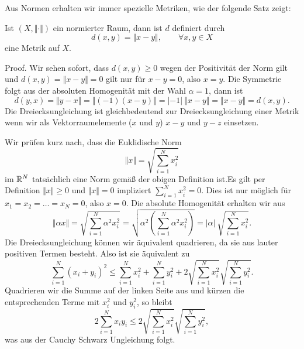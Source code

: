 Aus Normen erhalten wir immer spezielle Metriken, wie der folgende Satz zeigt:
\label{metrik/normen:theorem-2}
\begin{theorem}{}{}



Ist \((X,\Vert \cdot \Vert)\) ein normierter Raum, dann ist \(d\) definiert durch
\begin{equation*}
 d(x,y) = \Vert x - y \Vert ,\qquad \forall x,y \in X
\end{equation*}
eine Metrik auf \(X\).
\end{theorem}

\begin{emphBox}{}{}
Proof. Wir sehen sofort, dass \(d(x,y) \geq 0\) wegen der Positivität der Norm gilt und \(d(x,y) = \Vert x - y\Vert = 0\) gilt nur für \(x-y = 0\), also \(x=y\). Die Symmetrie folgt aus der absoluten Homogenität mit der Wahl \(\alpha = 1\), dann ist
\begin{equation*}
 d(y,x) = \Vert y- x \Vert = \Vert (-1)(x-y) \Vert = |-1|~\Vert x -y \Vert = \Vert x-y \Vert = d(x,y).
\end{equation*}
Die Dreiecksungleichung ist  gleichbedeutend zur Dreiecksungleichung einer Metrik wenn wir als Vektorraumelemente (\(x\) und \(y\)) \(x-y\) und \(y-z\) einsetzen.
\end{emphBox}
\label{metrik/normen:example-3}
\begin{example}{}{}



Wir prüfen kurz nach, dass die Euklidische Norm
\begin{equation*}
 \Vert x \Vert = \sqrt{\sum_{i=1}^N x_i^2}
\end{equation*}
im \(\mathbb{R}^N\) tatsächlich eine Norm gemäß der obigen Definition ist.Es gilt per Definition \(\Vert x \Vert \geq 0\) und \(\Vert x \Vert = 0\) impliziert \(\sum_{i=1}^N x_i^2=0\). Dies ist nur möglich für \(x_1=x_2=\ldots=x_N=0\), also \(x=0\). Die absolute Homogenität erhalten wir aus
\begin{equation*}
 \Vert \alpha x \Vert = \sqrt{\sum_{i=1}^N \alpha ^2 x_i^2} = \sqrt{\alpha^2 (\sum_{i=1}^N \alpha ^2 x_i^2)} = |\alpha|~ \sqrt{\sum_{i=1}^N x_i^2}.\end{equation*}
Die Dreiecksungleichung können wir äquivalent quadrieren, da sie aus lauter positiven Termen besteht. Also ist sie äquivalent zu
\begin{equation*}
  {\sum_{i=1}^N (x_i+y_i)^2} \leq \sum_{i=1}^N x_i^2 + \sum_{i=1}^N y_i^2 + 2 \sqrt{\sum_{i=1}^N x_i^2} \sqrt{\sum_{i=1}^N y_i^2}.
\end{equation*}
Quadrieren wir die Summe auf der linken Seite aus und kürzen die entsprechenden Terme mit \(x_i^2\) und \(y_i^2\), so bleibt
\begin{equation*}
 2 \sum_{i=1}^N x_i y_i \leq 2 \sqrt{\sum_{i=1}^N x_i^2} \sqrt{\sum_{i=1}^N y_i^2},
\end{equation*}
was aus der Cauchy Schwarz Ungleichung folgt.
\end{example}

